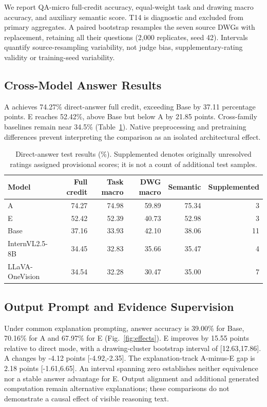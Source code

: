 We report QA-micro full-credit accuracy, equal-weight task and drawing macro accuracy, and auxiliary semantic score. T14 is diagnostic and excluded from primary aggregates. A paired bootstrap resamples the seven source DWGs with replacement, retaining all their questions (2,000 replicates, seed 42). Intervals quantify source-resampling variability, not judge bias, supplementary-rating validity or training-seed variability.

\subsection{Cross-Model Answer Results}
A achieves 74.27\% direct-answer full credit, exceeding Base by 37.11 percentage points. E reaches 52.42\%, above Base but below A by 21.85 points. Cross-family baselines remain near 34.5\% (Table~\ref{tab:main}). Native preprocessing and pretraining differences prevent interpreting the comparison as an isolated architectural effect.

\begin{table}[t]\centering\small
\caption{Direct-answer test results (\%). Supplemented denotes originally unresolved ratings assigned provisional scores; it is not a count of additional test samples.}\label{tab:main}
\begin{tabular}{lrrrrr}\toprule Model & Full credit & Task macro & DWG macro & Semantic & Supplemented\\\midrule
A & 74.27 & 74.98 & 59.89 & 75.34 & 3 \\
E & 52.42 & 52.39 & 40.73 & 52.98 & 3 \\
Base & 37.16 & 33.93 & 42.10 & 38.06 & 11 \\
InternVL2.5-8B & 34.45 & 32.83 & 35.66 & 35.47 & 4 \\
LLaVA-OneVision & 34.54 & 32.28 & 30.47 & 35.00 & 7 \\
\bottomrule\end{tabular}\end{table}
\subsection{Output Prompt and Evidence Supervision}
Under common explanation prompting, answer accuracy is 39.00\% for Base, 70.16\% for A and 67.97\% for E (Fig.~\ref{fig:effects}). E improves by 15.55 points relative to direct mode, with a drawing-cluster bootstrap interval of [12.63,17.86]. A changes by -4.12 points [-4.92,-2.35]. The explanation-track A-minus-E gap is 2.18 points [-1.61,6.65]. An interval spanning zero establishes neither equivalence nor a stable answer advantage for E. Output alignment and additional generated computation remain alternative explanations; these comparisons do not demonstrate a causal effect of visible reasoning text.

